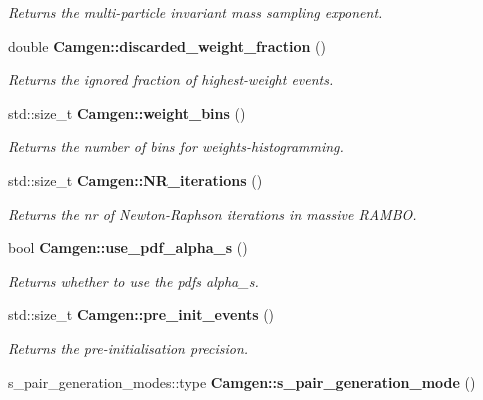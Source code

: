 \begin{DoxyCompactItemize}
\begin{DoxyCompactList}\small\item\em Returns the multi-\/particle invariant mass sampling exponent. \end{DoxyCompactList}\item 
\hypertarget{a00878_ab0a5373efc296afd16509ef6bb82601e}{}double {\bfseries Camgen\+::discarded\+\_\+weight\+\_\+fraction} ()\label{a00878_ab0a5373efc296afd16509ef6bb82601e}

\begin{DoxyCompactList}\small\item\em Returns the ignored fraction of highest-\/weight events. \end{DoxyCompactList}\item 
\hypertarget{a00878_a76102538735607adcb9e8d904203302d}{}std\+::size\+\_\+t {\bfseries Camgen\+::weight\+\_\+bins} ()\label{a00878_a76102538735607adcb9e8d904203302d}

\begin{DoxyCompactList}\small\item\em Returns the number of bins for weights-\/histogramming. \end{DoxyCompactList}\item 
\hypertarget{a00878_a97b1f4314d1b71089b429b36a56712a9}{}std\+::size\+\_\+t {\bfseries Camgen\+::\+N\+R\+\_\+iterations} ()\label{a00878_a97b1f4314d1b71089b429b36a56712a9}

\begin{DoxyCompactList}\small\item\em Returns the nr of Newton-\/\+Raphson iterations in massive R\+A\+M\+B\+O. \end{DoxyCompactList}\item 
\hypertarget{a00878_a22bfeba643397eecac7f5611cd031b3a}{}bool {\bfseries Camgen\+::use\+\_\+pdf\+\_\+alpha\+\_\+s} ()\label{a00878_a22bfeba643397eecac7f5611cd031b3a}

\begin{DoxyCompactList}\small\item\em Returns whether to use the pdf\textquotesingle{}s alpha\+\_\+s. \end{DoxyCompactList}\item 
\hypertarget{a00878_a4bbfbf420fc1ca323a5c5696a1c356a0}{}std\+::size\+\_\+t {\bfseries Camgen\+::pre\+\_\+init\+\_\+events} ()\label{a00878_a4bbfbf420fc1ca323a5c5696a1c356a0}

\begin{DoxyCompactList}\small\item\em Returns the pre-\/initialisation precision. \end{DoxyCompactList}\item 
\hypertarget{a00878_af8abca0440b21f67688eefe7f92a8138}{}s\+\_\+pair\+\_\+generation\+\_\+modes\+::type {\bfseries Camgen\+::s\+\_\+pair\+\_\+generation\+\_\+mode} ()\label{a00878_af8abca0440b21f67688eefe7f92a8138}


\end{DoxyCompactItemize}
